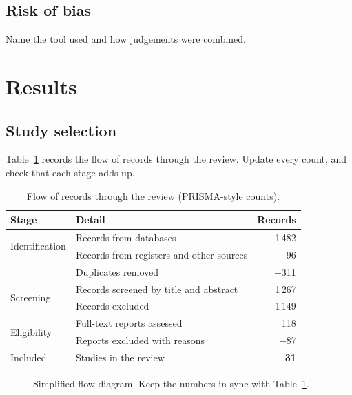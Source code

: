 \documentclass[11pt,a4paper]{article}
\begin{document}
\subsection{Risk of bias}
Name the tool used and how judgements were combined.

\section{Results}
\subsection{Study selection}
Table~\ref{tab:prisma} records the flow of records through the review. Update every count, and check that each stage adds up.

\begin{table}[ht]
\centering
\caption{Flow of records through the review (PRISMA-style counts).}
\label{tab:prisma}
\begin{tabular}{@{}llr@{}}
\toprule
Stage & Detail & Records \\
\midrule
\multirow{2}{*}{Identification} & Records from databases & 1\,482 \\
 & Records from registers and other sources & 96 \\
 & Duplicates removed & $-$311 \\
\midrule
\multirow{2}{*}{Screening} & Records screened by title and abstract & 1\,267 \\
 & Records excluded & $-$1\,149 \\
\midrule
\multirow{2}{*}{Eligibility} & Full-text reports assessed & 118 \\
 & Reports excluded with reasons & $-$87 \\
\midrule
Included & Studies in the review & \textbf{31} \\
\bottomrule
\end{tabular}
\end{table}

\begin{figure}[ht]
\centering
{}
\caption{Simplified flow diagram. Keep the numbers in sync with Table~\ref{tab:prisma}.}
\end{figure}
\end{document}
